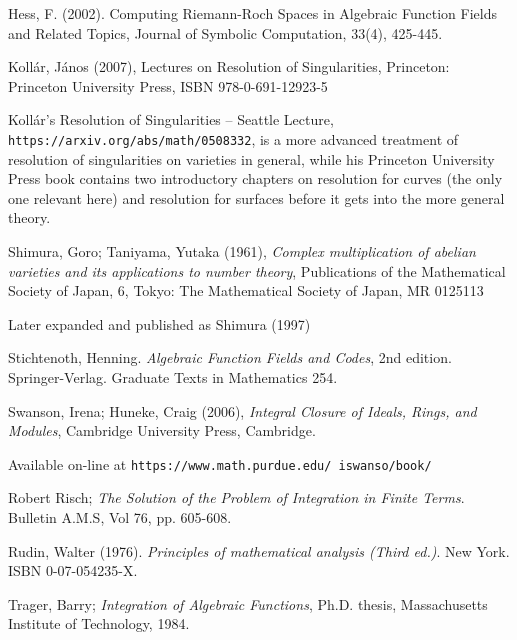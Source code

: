 \begin{thebibliography}{9}
Hess, F. (2002). Computing Riemann-Roch Spaces in Algebraic Function Fields and Related Topics,
Journal of Symbolic Computation, 33(4), 425-445.

Kollár, János (2007), Lectures on Resolution of Singularities, Princeton: Princeton University Press, ISBN 978-0-691-12923-5

Kollár's Resolution of Singularities -- Seattle Lecture, {\tt https://arxiv.org/abs/math/0508332},
is a more advanced treatment of resolution of singularities on varieties in general, while
his Princeton University Press book contains two introductory chapters on resolution for curves
(the only one relevant here) and resolution for surfaces before it gets into the more general theory.

Shimura, Goro; Taniyama, Yutaka (1961), {\it Complex multiplication of abelian varieties and its applications to number theory},
Publications of the Mathematical Society of Japan, 6, Tokyo: The Mathematical Society of Japan, MR 0125113

Later expanded and published as Shimura (1997)

Stichtenoth, Henning.  {\it Algebraic Function Fields and Codes}, 2nd edition.
Springer-Verlag.  Graduate Texts in Mathematics 254.

Swanson, Irena; Huneke, Craig (2006), {\it Integral Closure of Ideals, Rings, and Modules},
Cambridge University Press, Cambridge.

Available on-line at {\tt https://www.math.purdue.edu/~iswanso/book/}

Robert Risch; {\it The Solution of the Problem of Integration in Finite Terms}.  Bulletin A.M.S, Vol 76, pp. 605-608.

Rudin, Walter (1976). {\it Principles of mathematical analysis (Third ed.)}. New York. ISBN 0-07-054235-X.

Trager, Barry; {\it Integration of Algebraic Functions}, Ph.D. thesis, Massachusetts Institute of Technology, 1984.


\end{thebibliography}
